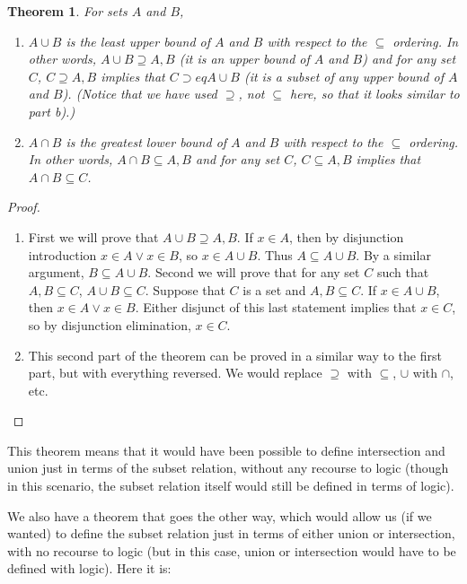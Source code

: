 \documentclass[12pt]{article}
\newcounter{thmc}
\newtheorem{thm}[thmc]{Theorem}
\begin{document}
\begin{thm}
  For sets $A$ and $B$,
  \begin{enumerate}[label=\alph*)]
    \item $A\cup B$ is the \textit{least upper bound} of $A$ and $B$
      with respect to the $\subseteq$ ordering.  In other words,
      $A\cup B\supseteq A, B$ (it is \textit{an} upper bound of $A$
      and $B$) and for any set $C$, $C\supseteq A, B$ implies that
      $C\supset eq A\cup B$ (it is a subset of any upper bound of $A$
      and $B$). (Notice that we have used $\supseteq$, not $\subseteq$
      here, so that it looks similar to part b).)
    \item $A\cap B$ is the \textit{greatest lower bound} of $A$ and
      $B$ with respect to the $\subseteq$ ordering.  In other words,
      $A\cap B\subseteq A,B$ and for any set $C$, $C\subseteq A,B$
      implies that $A\cap B \subseteq C$.
  \end{enumerate}
\end{thm}

\begin{proof}
  \begin{enumerate}[label=\alph*)]
    \item First we will prove that $A\cup B\supseteq A,B$.  If $x\in
      A$, then by disjunction introduction $x\in A \vee x\in B$, so
      $x\in A\cup B$.  Thus $A\subseteq A\cup B$.  By a similar
      argument, $B\subseteq A\cup B$.  Second we will prove that for
      any set $C$ such that $A,B\subseteq C$, $A\cup B\subseteq C$.
      Suppose that $C$ is a set and $A,B\subseteq C$.  If $x\in A\cup
      B$, then $x\in A \vee x\in B$.  Either disjunct of this last
      statement implies that $x\in C$, so by disjunction elimination,
      $x\in C$.
    \item This second part of the theorem can be proved in a similar
      way to the first part, but with everything reversed.  We would
      replace $\supseteq$ with $\subseteq$, $\cup$ with $\cap$, etc.
  \end{enumerate}
\end{proof}

This theorem means that it would have been possible to define
intersection and union just in terms of the subset relation, without
any recourse to logic (though in this scenario, the subset relation
itself would still be defined in terms of logic).

We also have a theorem that goes the other way, which would allow us
(if we wanted) to define the subset relation just in terms of either
union or intersection, with no recourse to logic (but in this case,
union or intersection would have to be defined with logic).  Here it
is:
\end{document}
